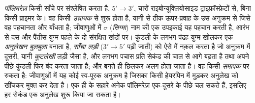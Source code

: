 \begin{definition}[RNA पॉलिमरेज़, उन्नायक, अनुलेखन]\label{def:b1:gene-expression:transcription}
\emph{ पॉलिमरेज़} किसी  साँचे पर  संश्लेषित करता है, $5' \to 3'$,
चारों राइबोन्यूक्लियोसाइड ट्राइफ़ॉस्फ़ेटों से, बिना किसी प्राइमर के। वह
किसी \emph{उन्नायक} से शुरू होता है, यानी  से ठीक ऊपर-प्रवाह के उस
अनुक्रम से जिसे वह पहचानता और बाँधता है; जीवाणुओं में
$\sigma$ (\emph{सिग्मा}) नाम की एक उपइकाई यह पहचान करती है, आरंभ से दस
और पैंतीस युग्म पहले के दो संरक्षित खंडों पर।  कुंडली के लगभग
पंद्रह युग्म खोलकर एक \emph{अनुलेखन बुलबुला} बनाता है,
\emph{साँचा लड़ी} ($3' \to 5'$ पढ़ी जाती) को ऐसे  में नक़ल करता है जो
अनुक्रम में दूसरी, यानी \emph{कूटलेखी} लड़ी जैसा है, और लगभग पचास
 प्रति सेकंड की चाल से आगे बढ़ता है तथा अपने पीछे कुंडली
फिर बंद करता जाता है; और  बनते ही छिलकर अलग होता जाता है। वह किसी
\emph{समापक} पर रुकता है: जीवाणुओं में यह कोई स्व-पूरक अनुक्रम है जिसका
 किसी हेयरपिन में मुड़कर अनुलेख को खींचकर मुक्त कर देता है। एक ही 
के सहारे अनेक पॉलिमरेज़ एक-दूसरे के पीछे चल सकते हैं, इसलिए हर सेकंड एक
अनुलेख शुरू किया जा सकता है।
\end{definition}

